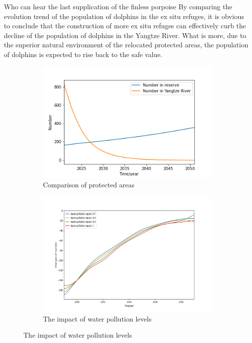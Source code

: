 \documentclass[12pt]{article}  %
\begin{document}
\begin{letter}{Who can hear the last supplication of the finless porpoise}
By comparing the evolution trend of the population of dolphins in the ex situ refuges, it is obvious to conclude that the construction of more ex situ refuges can effectively curb the decline of the population of dolphins in the Yangtze River. What is more, due to the superior natural environment of the relocated protected areas, the population of dolphins is expected to rise back to the safe value.
\begin{figure}[htbp]
\centering
\begin{subfigure}[b]{.4\textwidth}
\includegraphics[width=\textwidth]{figures/procom.png}
\caption{Comparison of protected areas}\label{subfig:left}
\end{subfigure}
\begin{subfigure}[b]{.4\textwidth}
\includegraphics[width=\textwidth]{figures/le2.png}
\caption{The impact of water pollution levels}\label{subfig:right}
\end{subfigure}
\end{figure}


\end{letter}
\end{document}
